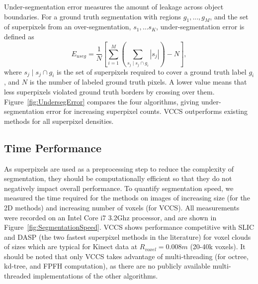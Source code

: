 Under-segmentation error measures the amount of leakage across object boundaries. For a ground truth segmentation with regions $g_1,...,g_M$, and the set of superpixels from an over-segmentation, $s_1,...s_K$, under-segmentation error is defined as 
\begin{equation}
\label{eqn:UndersegError}
{E}_{useg}=\frac{1}{N} \left[ \sum_{i=1}^{M}{\left(\sum_{s_j \mid s_j \cap g_i}{|s_j|}\right)-N} \right],
\end{equation}
where $s_j \mid s_j \cap g_i$ is the set of superpixels required to cover a ground truth label $g_i$, and $N$ is the number of labeled ground truth pixels. A lower value means that less superpixels violated ground truth borders by crossing over them. Figure~\ref{fig:UndersegError} compares the four algorithms, giving under-segmentation error for increasing superpixel counts. VCCS outperforms existing methods for all superpixel densities. 

\subsection{Time Performance}
As superpixels are used as a preprocessing step to reduce the complexity of segmentation, they should be computationally efficient so that they do not negatively impact overall performance. To quantify segmentation speed, we measured the time required for the methods on images of increasing size (for the 2D methods) and increasing number of voxels (for VCCS). All measurements were recorded on an Intel Core i7 3.2Ghz processor, and are shown in Figure~\ref{fig:SegmentationSpeed}. VCCS shows performance competitive with SLIC and DASP (the two fastest superpixel methods in the literature) for voxel clouds of sizes which are typical for Kinect data at ${R}_{voxel}=0.008m$ (20-40k voxels). It should be noted that only VCCS takes advantage of multi-threading (for octree, kd-tree, and FPFH computation), as there are no publicly available multi-threaded implementations of the other algorithms.  

